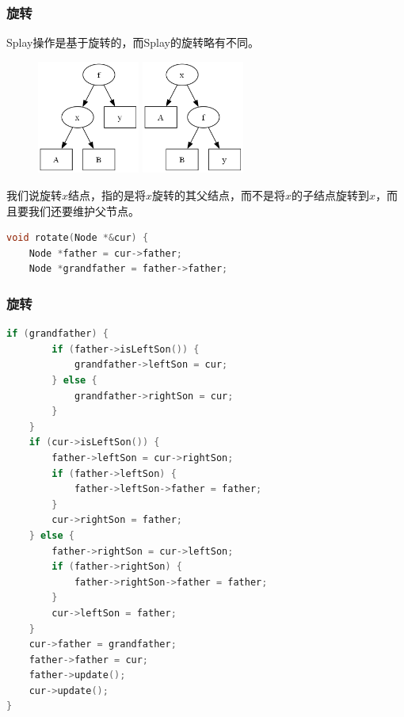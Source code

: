 \documentclass[utf8]{ctexbeamer}
\begin{document}
    \begin{frame}[fragile]
        \frametitle{旋转}
        Splay操作是基于旋转的，而Splay的旋转略有不同。
        \begin{figure}
            \includegraphics[width=0.3\textwidth]{images/right_rotate0.png}
            \includegraphics[width=0.3\textwidth]{images/right_rotate2.png}
        \end{figure}
        我们说旋转$x$结点，指的是将$x$旋转的其父结点，而不是将$x$的子结点旋转到$x$，而且要我们还要维护父节点。
        \begin{lstlisting}[language=c++]
void rotate(Node *&cur) {
    Node *father = cur->father;
    Node *grandfather = father->father;
        \end{lstlisting}
    \end{frame}

    \begin{frame}[fragile]
        \frametitle{旋转}
        \begin{lstlisting}[language=c++]
    if (grandfather) {
        if (father->isLeftSon()) {
            grandfather->leftSon = cur;
        } else {
            grandfather->rightSon = cur;
        }
    }
    if (cur->isLeftSon()) {
        father->leftSon = cur->rightSon;
        if (father->leftSon) {
            father->leftSon->father = father;
        }
        cur->rightSon = father;
    } else {
        father->rightSon = cur->leftSon;
        if (father->rightSon) {
            father->rightSon->father = father;
        }
        cur->leftSon = father;
    }
    cur->father = grandfather;
    father->father = cur;
    father->update();
    cur->update();
}
        \end{lstlisting}
    \end{frame}
\end{document}
